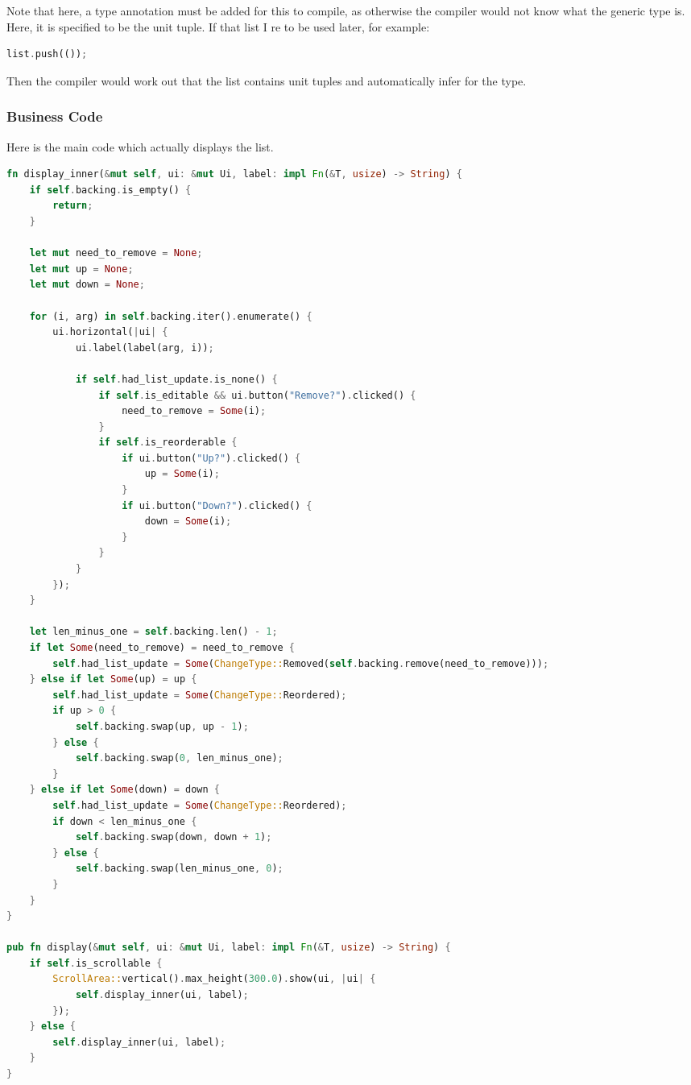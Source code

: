 \documentclass{article}
\begin{document}
\begin{multicols*}{2}
Note that here, a type annotation must be added for this to compile, as otherwise the compiler would not know what the generic type is. Here, it is specified to be the unit tuple. If that list I re to be used later, for example:
\begin{lstlisting}[language=Rust]
list.push(());
\end{lstlisting}
Then the compiler would work out that the list contains unit tuples and automatically infer for the type.

\subsubsection{Business Code}
Here is the main code which actually displays the list.

\begin{lstlisting}[language=Rust]
fn display_inner(&mut self, ui: &mut Ui, label: impl Fn(&T, usize) -> String) {
	if self.backing.is_empty() {
		return;
	}
	
	let mut need_to_remove = None; 
	let mut up = None; 
	let mut down = None;
	
	for (i, arg) in self.backing.iter().enumerate() {
		ui.horizontal(|ui| {
			ui.label(label(arg, i)); 
			
			if self.had_list_update.is_none() {
				if self.is_editable && ui.button("Remove?").clicked() {
					need_to_remove = Some(i);
				}
				if self.is_reorderable {
					if ui.button("Up?").clicked() {
						up = Some(i);
					}
					if ui.button("Down?").clicked() {
						down = Some(i);
					}
				}
			}
		});
	}
	
	let len_minus_one = self.backing.len() - 1;
	if let Some(need_to_remove) = need_to_remove {
		self.had_list_update = Some(ChangeType::Removed(self.backing.remove(need_to_remove)));
	} else if let Some(up) = up {
		self.had_list_update = Some(ChangeType::Reordered);
		if up > 0 {
			self.backing.swap(up, up - 1);
		} else {
			self.backing.swap(0, len_minus_one);
		}
	} else if let Some(down) = down {
		self.had_list_update = Some(ChangeType::Reordered);
		if down < len_minus_one {
			self.backing.swap(down, down + 1);
		} else {
			self.backing.swap(len_minus_one, 0);
		}
	}
}

pub fn display(&mut self, ui: &mut Ui, label: impl Fn(&T, usize) -> String) {	
	if self.is_scrollable {
		ScrollArea::vertical().max_height(300.0).show(ui, |ui| {
			self.display_inner(ui, label);
		});
	} else {
		self.display_inner(ui, label);
	}
}
\end{lstlisting}


\end{multicols*}
\end{document}
